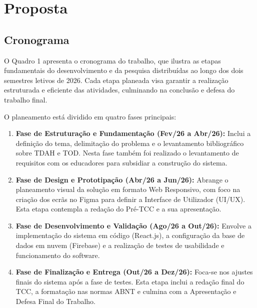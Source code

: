\chapter{Proposta}
\label{chap:proposta}

\vspace{0.2cm}
\section{Cronograma}

O Quadro 1 apresenta o cronograma do trabalho, que ilustra as etapas fundamentais do desenvolvimento e da pesquisa distribuídas ao longo dos dois semestres letivos de 2026. Cada etapa planeada visa garantir a realização estruturada e eficiente das atividades, culminando na conclusão e defesa do trabalho final.

\vspace{0.2cm}
\noindent O planeamento está dividido em quatro fases principais:

\begin{enumerate}
    \item \textbf{Fase de Estruturação e Fundamentação (Fev/26 a Abr/26):} Inclui a definição do tema, delimitação do problema e o levantamento bibliográfico sobre TDAH e TOD. Nesta fase também foi realizado o levantamento de requisitos com os educadores para subsidiar a construção do sistema.

    \item \textbf{Fase de Design e Prototipação (Abr/26 a Jun/26):} Abrange o planeamento visual da solução em formato Web Responsivo, com foco na criação dos ecrãs no Figma para definir a Interface de Utilizador (UI/UX). Esta etapa contempla a redação do Pré-TCC e a sua apresentação.

    \item \textbf{Fase de Desenvolvimento e Validação (Ago/26 a Out/26):} Envolve a implementação do sistema em código (React.js), a configuração da base de dados em nuvem (Firebase) e a realização de testes de usabilidade e funcionamento do software.

    \item \textbf{Fase de Finalização e Entrega (Out/26 a Dez/26):} Foca-se nos ajustes finais do sistema após a fase de testes. Esta etapa inclui a redação final do TCC, a formatação nas normas ABNT e culmina com a Apresentação e Defesa Final do Trabalho.
\end{enumerate}

